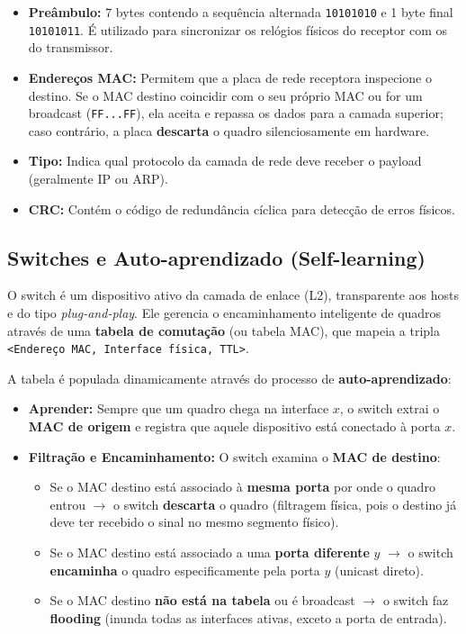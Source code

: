 \documentclass[11pt,a4paper]{article}
\begin{document}
\begin{itemize}
    \item \textbf{Preâmbulo:} 7 bytes contendo a sequência alternada \texttt{10101010} e 1 byte final \texttt{10101011}. É utilizado para sincronizar os relógios físicos do receptor com os do transmissor.
    \item \textbf{Endereços MAC:} Permitem que a placa de rede receptora inspecione o destino. Se o MAC destino coincidir com o seu próprio MAC ou for um broadcast (\texttt{FF...FF}), ela aceita e repassa os dados para a camada superior; caso contrário, a placa \textbf{descarta} o quadro silenciosamente em hardware.
    \item \textbf{Tipo:} Indica qual protocolo da camada de rede deve receber o payload (geralmente IP ou ARP).
    \item \textbf{CRC:} Contém o código de redundância cíclica para detecção de erros físicos.
\end{itemize}

\subsection{Switches e Auto-aprendizado (Self-learning)}

O switch é um dispositivo ativo da camada de enlace (L2), transparente aos hosts e do tipo \emph{plug-and-play}. Ele gerencia o encaminhamento inteligente de quadros através de uma \textbf{tabela de comutação} (ou tabela MAC), que mapeia a tripla \texttt{<Endereço MAC, Interface física, TTL>}.

A tabela é populada dinamicamente através do processo de \textbf{auto-aprendizado}:
\begin{itemize}
    \item \textbf{Aprender:} Sempre que um quadro chega na interface $x$, o switch extrai o \textbf{MAC de origem} e registra que aquele dispositivo está conectado à porta $x$.
    \item \textbf{Filtração e Encaminhamento:} O switch examina o \textbf{MAC de destino}:
    \begin{itemize}
        \item Se o MAC destino está associado à \textbf{mesma porta} por onde o quadro entrou $\to$ o switch \textbf{descarta} o quadro (filtragem física, pois o destino já deve ter recebido o sinal no mesmo segmento físico).
        \item Se o MAC destino está associado a uma \textbf{porta diferente} $y$ $\to$ o switch \textbf{encaminha} o quadro especificamente pela porta $y$ (unicast direto).
        \item Se o MAC destino \textbf{não está na tabela} ou é broadcast $\to$ o switch faz \textbf{flooding} (inunda todas as interfaces ativas, exceto a porta de entrada).
    \end{itemize}
\end{itemize}
\end{document}

